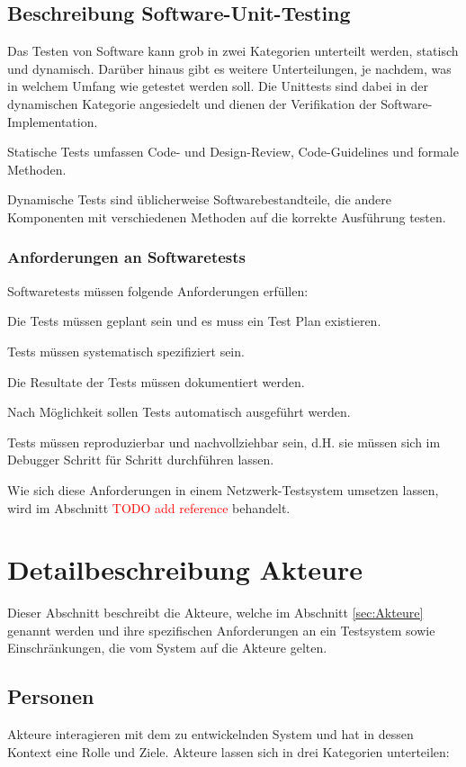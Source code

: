 \documentclass[
	ngerman,
	toc=listof, %
	toc=bibliography, %
	footnotes=multiple, %
	parskip=half, %
	numbers=noendperiod %
]{scrartcl}
\begin{document}
	\subsection{Beschreibung Software-Unit-Testing}
	Das Testen von Software kann grob in zwei Kategorien unterteilt werden, statisch und dynamisch. 
	Darüber hinaus gibt es weitere Unterteilungen, je nachdem, was in welchem Umfang wie getestet werden soll. Die Unittests sind dabei in der dynamischen Kategorie angesiedelt und dienen der Verifikation der Software-Implementation.

	Statische Tests umfassen Code- und Design-Review, Code-Guidelines und formale Methoden.

	Dynamische Tests sind üblicherweise Softwarebestandteile, die andere Komponenten mit verschiedenen Methoden auf die korrekte Ausführung testen. 

		\subsubsection{Anforderungen an Softwaretests}
		Softwaretests müssen folgende Anforderungen erfüllen:

		Die Tests müssen geplant sein und es muss ein Test Plan existieren.

		Tests müssen systematisch spezifiziert sein.

		Die Resultate der Tests müssen dokumentiert werden.

		Nach Möglichkeit sollen Tests automatisch ausgeführt werden.

		Tests müssen reproduzierbar und nachvollziehbar sein, d.H. sie müssen sich im Debugger Schritt für Schritt durchführen lassen.
		
		Wie sich diese Anforderungen in einem Netzwerk-Testsystem umsetzen lassen, wird im Abschnitt \textcolor{red}{TODO add reference} behandelt.
	
\section{Detailbeschreibung Akteure}
Dieser Abschnitt beschreibt die Akteure, welche im Abschnitt \ref{sec:Akteure} genannt werden und ihre spezifischen Anforderungen an ein Testsystem sowie Einschränkungen, die vom System auf die Akteure gelten.
	
	\subsection{Personen}
	Akteure interagieren mit dem zu entwickelnden System und hat in dessen Kontext eine Rolle und Ziele.
	Akteure lassen sich in drei Kategorien unterteilen: 
		
\end{document}
